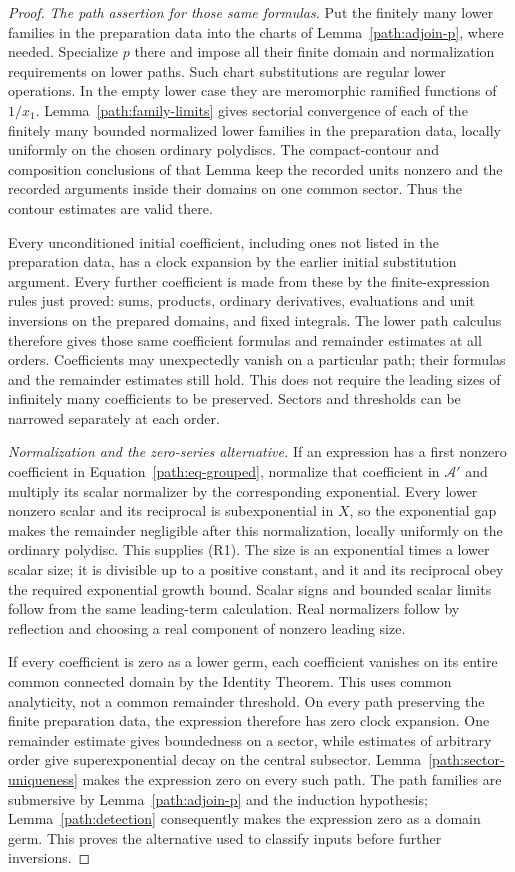 \begin{proof}
\emph{The path assertion for those same formulas.}
Put the finitely many lower families in the preparation data into
the charts of Lemma~\ref{path:adjoin-p}, where needed.  Specialize
\(p\) there and impose all their finite domain and normalization
requirements on lower paths.  Such chart substitutions are regular
lower operations.  In the empty lower case they are meromorphic
ramified functions of \(1/x_1\).
Lemma~\ref{path:family-limits} gives sectorial convergence of each
of the finitely many bounded normalized lower families in the
preparation data, locally uniformly on the chosen ordinary
polydiscs.  The compact-contour and composition conclusions of
that Lemma keep the recorded units nonzero and the recorded
arguments inside their domains on one common sector.  Thus the
contour estimates are valid there.

Every unconditioned initial coefficient, including ones not listed
in the preparation data, has a clock expansion by the earlier initial
substitution argument.  Every further coefficient is made from these
by the finite-expression rules just proved: sums, products, ordinary
derivatives, evaluations and unit inversions on the prepared domains,
and fixed integrals.  The lower path calculus therefore gives those
same coefficient formulas and remainder estimates at all orders.
Coefficients may unexpectedly vanish on a particular path; their
formulas and the remainder estimates still hold.  This does not
require the leading sizes of infinitely many coefficients to be
preserved.  Sectors and thresholds can be narrowed separately at
each order.

\emph{Normalization and the zero-series alternative.}
If an expression has a first nonzero coefficient in
Equation~\eqref{path:eq-grouped}, normalize that coefficient in
\(\mathcal A'\) and multiply its scalar normalizer by the corresponding
exponential.  Every lower nonzero scalar and its reciprocal is
subexponential in \(X\), so the exponential gap makes the remainder
negligible after this normalization, locally uniformly on the ordinary
polydisc.  This supplies \textup{(R1)}.  The size is an exponential
times a lower scalar size; it is divisible up to a positive constant,
and it and its reciprocal obey the required exponential growth bound.
Scalar signs and bounded scalar limits follow from the same leading-term
calculation.  Real normalizers follow by reflection and choosing a
real component of nonzero leading size.

If every coefficient is zero as a lower germ, each coefficient
vanishes on its entire common connected domain by the Identity Theorem.
This uses common analyticity, not a common remainder threshold.  On
every path preserving the finite preparation data, the expression
therefore has zero clock expansion.  One remainder estimate gives
boundedness on a sector, while estimates of arbitrary order give
superexponential decay on the central subsector.  Lemma~\ref{path:sector-uniqueness}
makes the expression zero on every such path.  The path families
are submersive by Lemma~\ref{path:adjoin-p} and the induction
hypothesis; Lemma~\ref{path:detection} consequently makes the expression
zero as a domain germ.  This proves the alternative used to classify
inputs before further inversions.


\end{proof}
